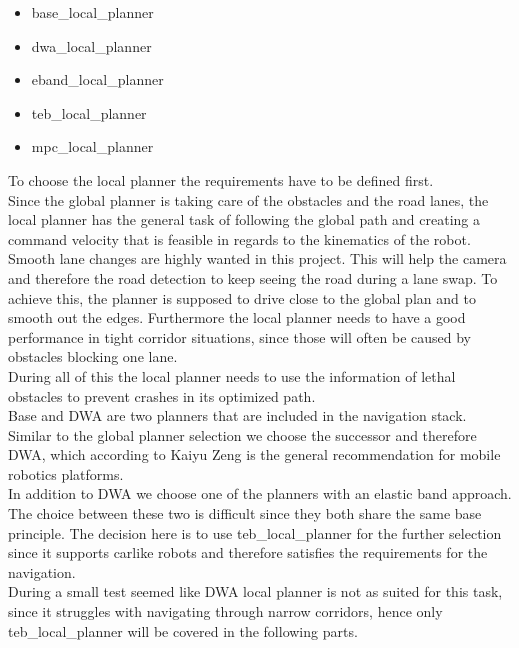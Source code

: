 \begin{itemize}
	\item base\_local\_planner
	\item dwa\_local\_planner
	\item eband\_local\_planner
	\item teb\_local\_planner
	\item mpc\_local\_planner
\end{itemize}

To choose the local planner the requirements have to be defined first.\\

Since the global planner is taking care of the obstacles and the road lanes, the local planner has the general task of following the global path and creating a command velocity that is feasible in regards to the kinematics of the robot.\\

Smooth lane changes are highly wanted in this project. This will help the camera and therefore the road detection to keep seeing the road during a lane swap. To achieve this, the planner is supposed to drive close to the global plan and to smooth out the edges.
Furthermore the local planner needs to have a good performance in tight corridor situations, since those will often be caused by obstacles blocking one lane.\\

During all of this the local planner needs to use the information of lethal obstacles to prevent crashes in its optimized path.\\


Base and DWA are two planners that are included in the navigation stack. Similar to the global planner selection we choose the successor and therefore DWA, which according to Kaiyu Zeng is the general recommendation for mobile robotics platforms\cite{navtuningguide}.\\


In addition to DWA we choose one of the planners with an elastic band approach. The choice between these two is difficult since they both share the same base principle. The decision here is to use teb\_local\_planner for the further selection since it supports carlike robots and therefore satisfies the requirements for the navigation.\\

During a small test seemed like DWA local planner is not as suited for this task, since it struggles with navigating through narrow corridors, hence only teb\_local\_planner will be covered in the following parts.

